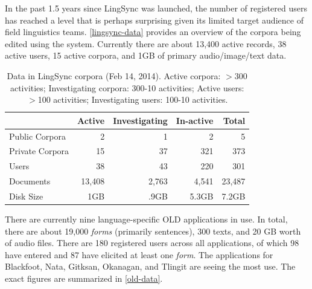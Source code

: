 \documentclass[11pt]{article}
\newcommand{\smalltodo}[2][]
    {\todo[caption={#2}, #1]
    {\tiny#2\normalsize}}
\begin{document}
In the past 1.5 years since LingSync was launched, the number of registered
users has reached a level that is perhaps surprising given its limited target
audience of field linguistics teams. \autoref{lingsync-data} provides an
overview of the corpora being edited using the system. Currently there are
about 13,400 active records, 38 active users, 15 active corpora, and 1GB of
primary audio/image/text data.


\begin{table}[h]
\begin{center}
\scriptsize
\begin{tabular}{lrrrr}
      \toprule
                     ~ &  Active & Investigating & In-active & Total\\
      \midrule
      Public Corpora  &       2 &   1 &   2 & 5 \\ 
      Private Corpora &      15 &  37 & 321 & 373\\ 
      Users           &      38 &  43 & 220 & 301 \\
      Documents & 13,408 & 2,763 & 4,541 &23,487\\
      Disk Size & 1GB & .9GB & 5.3GB& 7.2GB\\
      
      \bottomrule

\end{tabular}
\caption{Data in LingSync corpora (Feb 14, 2014).
Active corpora: $>$300 activities; Investigating corpora: 300-10 activities; Active users: $>$100 activities; Investigating users: 100-10 activities.}
\label{lingsync-data}
 \end{center}
 \normalsize
\end{table}




There are currently nine language-specific OLD applications in use. In total,
there are about 19,000 \emph{forms} (primarily sentences), 300 texts, and 20 GB worth
of audio files.  There are 180 registered users across all applications, of
which 98 have entered and 87 have elicited at least one \emph{form}. The applications
for Blackfoot, Nata, Gitksan, Okanagan, and Tlingit are seeing the most use. The
exact figures are summarized in \autoref{old-data}.
\end{document}
